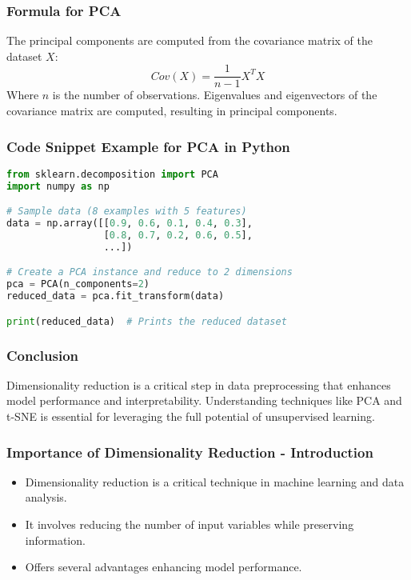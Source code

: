 \documentclass[aspectratio=169]{beamer}
\begin{document}
\begin{frame}[fragile]
    \frametitle{Formula for PCA}
    The principal components are computed from the covariance matrix of the dataset \(X\):
    \begin{equation}
        Cov(X) = \frac{1}{n-1} X^T X
    \end{equation}
    Where \(n\) is the number of observations. Eigenvalues and eigenvectors of the covariance matrix are computed, resulting in principal components.
\end{frame}

\begin{frame}[fragile]
    \frametitle{Code Snippet Example for PCA in Python}
    \begin{lstlisting}[language=Python]
from sklearn.decomposition import PCA
import numpy as np

# Sample data (8 examples with 5 features)
data = np.array([[0.9, 0.6, 0.1, 0.4, 0.3],
                 [0.8, 0.7, 0.2, 0.6, 0.5],
                 ...])

# Create a PCA instance and reduce to 2 dimensions
pca = PCA(n_components=2)
reduced_data = pca.fit_transform(data)

print(reduced_data)  # Prints the reduced dataset
    \end{lstlisting}
\end{frame}

\begin{frame}[fragile]
    \frametitle{Conclusion}
    Dimensionality reduction is a critical step in data preprocessing that enhances model performance and interpretability. 
    Understanding techniques like PCA and t-SNE is essential for leveraging the full potential of unsupervised learning.
\end{frame}

\begin{frame}[fragile]
    \frametitle{Importance of Dimensionality Reduction - Introduction}
    \begin{itemize}
        \item Dimensionality reduction is a critical technique in machine learning and data analysis.
        \item It involves reducing the number of input variables while preserving information.
        \item Offers several advantages enhancing model performance.
    \end{itemize}
\end{frame}
\end{document}
